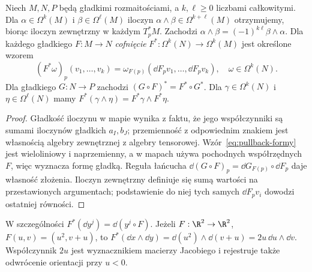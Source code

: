 \begin{stwierdzenie}
\label{prop:formy-wedge-pullback}
Niech $M,N,P$ będą gładkimi rozmaitościami,
a $k,\ell\geq0$ liczbami całkowitymi.
Dla $\alpha\in\Omega^k(M)$ i $\beta\in\Omega^\ell(M)$
iloczyn $\alpha\wedge\beta\in\Omega^{k+\ell}(M)$
otrzymujemy, biorąc iloczyn zewnętrzny w każdym
$T_p^*M$. Zachodzi $\alpha\wedge\beta
=(-1)^{k\ell}\beta\wedge\alpha$.
Dla każdego gładkiego $F:M\to N$ \emph{cofnięcie}
$F^*:\Omega^k(N)\to\Omega^k(M)$ jest określone wzorem
\begin{equation}\label{eq:pullback-formy}
 (F^*\omega)_p(v_1,\ldots,v_k)
 =\omega_{F(p)}(\dd F_pv_1,\ldots,\dd F_pv_k),
 \quad \omega\in\Omega^k(N).
\end{equation}
Dla gładkiego $G:N\to P$ zachodzi
$(G\circ F)^*=F^*\circ G^*$.
Dla $\gamma\in\Omega^k(N)$ i $\eta\in\Omega^\ell(N)$ mamy
$F^*(\gamma\wedge\eta)=F^*\gamma\wedge F^*\eta$.
\end{stwierdzenie}
\begin{proof}
Gładkość iloczynu w mapie wynika z faktu, że jego
współczynniki są sumami iloczynów gładkich $a_I,b_J$;
przemienność z odpowiednim znakiem jest własnością
algebry zewnętrznej z algebry tensorowej.
Wzór~\eqref{eq:pullback-formy} jest wieloliniowy i
naprzemienny, a w mapach używa pochodnych współrzędnych
$F$, więc wyznacza formę gładką. Reguła łańcucha
$\dd(G\circ F)_p=\dd G_{F(p)}\circ\dd F_p$
daje własność złożenia. Iloczyn zewnętrzny definiuje
się sumą wartości na przestawionych argumentach; podstawienie
do niej tych samych $\dd F_pv_i$ dowodzi ostatniej równości.
\end{proof}

W szczególności $F^*(\dd y^j)=\dd(y^j\circ F)$.
Jeżeli $F:\R^2\to\R^2$, $F(u,v)=(u^2,v+u)$,
to $F^*(\dd x\wedge\dd y)
=\dd(u^2)\wedge\dd(v+u)=2u\,\dd u\wedge\dd v$.
Współczynnik $2u$ jest wyznacznikiem macierzy Jacobiego
i rejestruje także odwrócenie orientacji przy $u<0$.

